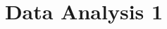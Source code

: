 \documentclass{article}
\title{Data Analysis 1}
\begin{document}

\tableofcontents
\vfill
\newpage







\end{document}
